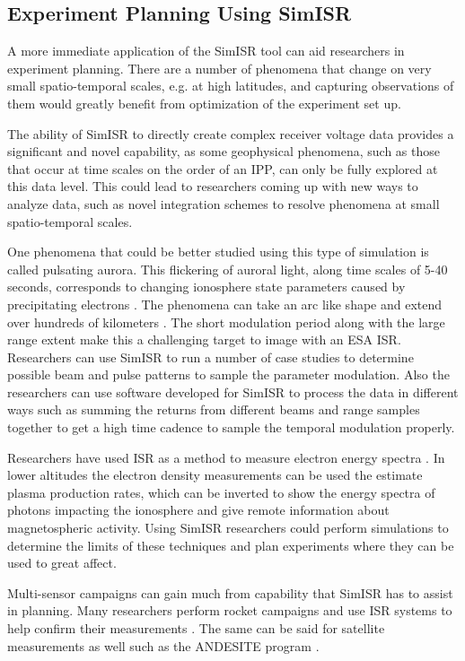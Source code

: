 \subsection{Experiment Planning Using SimISR}

A more immediate application of the SimISR tool can aid researchers in experiment planning. There are a number of phenomena that change on very small spatio-temporal scales, e.g. at high latitudes, and capturing observations of them would greatly benefit from optimization of the experiment set up. 

The ability of SimISR to directly create complex receiver voltage data provides a significant and novel capability, as some geophysical phenomena, such as those that occur at time scales on the order of an IPP, can only be fully explored at this data level. This could lead to researchers coming up with new ways to analyze data, such as novel integration schemes to resolve phenomena at small spatio-temporal scales.

One phenomena that could be better studied using this type of simulation is called pulsating aurora. This flickering of auroral light, along time scales of 5-40 seconds, corresponds to changing ionosphere state parameters caused by precipitating electrons \citep{JGRA:JGRA21510}. The phenomena can take an arc like shape and extend over hundreds of kilometers \citep{JGRA:JGRA20202}. The short modulation period along with the large range extent make this a challenging target to image with an ESA ISR. Researchers can use SimISR to run a number of case studies to determine possible beam and pulse patterns to sample the parameter modulation. Also the researchers can use software developed for SimISR to process the data in different ways such as summing the returns from different beams and range samples together to get a high time cadence to sample the temporal modulation properly. 

Researchers have used ISR as a method to measure electron energy spectra \citep{Semeter:2005foa}. In lower altitudes the electron density measurements can be used the estimate plasma production rates, which can be inverted to show the energy spectra of photons impacting the ionosphere and give remote information about magnetospheric activity. Using SimISR researchers could perform simulations to determine the limits of these techniques and plan experiments where they can be used to great affect.

Multi-sensor campaigns can gain much from capability that SimISR has to assist in planning. Many researchers perform rocket campaigns and use ISR systems to help confirm their measurements \citep{JGRA:JGRA50924}. The same can be said for satellite measurements as well such as the ANDESITE program \citep{parham2016multi}. 

